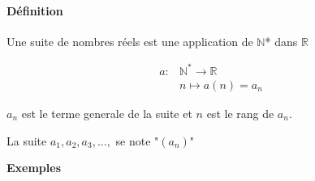 \documentclass[
    11pt,
    a4paper,
    oneside,
    headinlcude, footinclude,
    twoside,
]{report}
\begin{document}
\paragraph{Définition}
\label{par:definition}

Une suite de nombres réels est une application de $\mathbb{N}$* dans $\mathbb{R}$

\begin{equation*}
\begin{split}
a : & \mathbb{N}^{\ast} \longrightarrow \mathbb{R}\\
& n \longmapsto a(n) = a_{n}
\end{split}
\end{equation*}

$a_{n}$ est le terme generale de la suite et $n$ est le rang de $a_{n}$.

La suite $a _{1}, a _{2}, a _{3}, ..., $ se note "$(a _{n})$"

\textbf{Exemples} 
\end{document}
